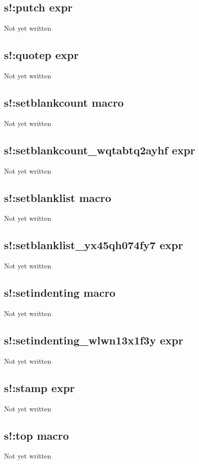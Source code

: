 \documentclass[a4paper,11pt]{article}
\begin{document}
\subsection{\ttfamily s!:putch expr}
Not yet written

\subsection{\ttfamily s!:quotep expr}
Not yet written

\subsection{\ttfamily s!:setblankcount macro}
Not yet written

\subsection{\ttfamily s!:setblankcount\_wqtabtq2ayhf expr}
Not yet written

\subsection{\ttfamily s!:setblanklist macro}
Not yet written

\subsection{\ttfamily s!:setblanklist\_yx45qh074fy7 expr}
Not yet written

\subsection{\ttfamily s!:setindenting macro}
Not yet written

\subsection{\ttfamily s!:setindenting\_wlwn13x1f3y expr}
Not yet written

\subsection{\ttfamily s!:stamp expr}
Not yet written

\subsection{\ttfamily s!:top macro}
Not yet written
\end{document}
